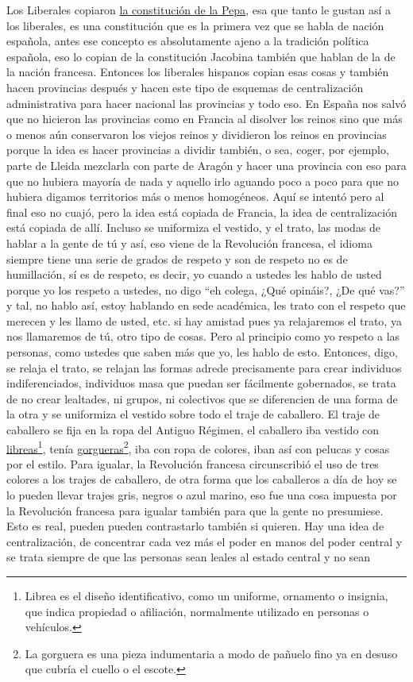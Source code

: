 Los Liberales copiaron \href{https://en.wikipedia.org/wiki/Spanish_Constitution_of_1812}{la constitución de la Pepa}, esa que tanto le gustan así a los liberales, es una constitución que es la primera vez que se habla de nación española, antes ese concepto es absolutamente ajeno a la tradición política española, eso lo copian de la constitución Jacobina también que hablan de la de la nación francesa. Entonces los liberales hispanos copian esas cosas y también hacen provincias después y hacen este tipo de esquemas de centralización administrativa para hacer nacional las provincias y todo eso. En España nos salvó que no hicieron las provincias como en Francia al disolver los reinos sino que más o menos aún conservaron los viejos reinos y dividieron los reinos en provincias porque la idea es hacer provincias a dividir también, o sea, coger, por ejemplo, parte de Lleida mezclarla con parte de Aragón y hacer una provincia con eso para que no hubiera mayoría de nada y aquello irlo aguando poco a poco para que no hubiera digamos territorios más o menos homogéneos. Aquí se intentó pero al final eso no cuajó, pero la idea está copiada de Francia, la idea de centralización está copiada de allí. Incluso se uniformiza el vestido, y el trato, las modas de hablar a la gente de tú y así, eso viene de la Revolución francesa, el idioma siempre tiene una serie de grados de respeto y son de respeto no es de humillación, sí es de respeto, es decir, yo cuando a ustedes les hablo de usted porque yo los respeto a ustedes, no digo \enquote{eh colega, ¿Qué opináis?, ¿De qué vas?} y tal, no hablo así, estoy hablando en sede académica, les trato con el respeto que merecen y les llamo de usted, etc. si hay amistad pues ya relajaremos el trato, ya nos llamaremos de tú, otro tipo de cosas. Pero al principio como yo respeto a las personas, como ustedes que saben más que yo, les hablo de esto. Entonces, digo, se relaja el trato, se relajan las formas adrede precisamente para crear individuos indiferenciados, individuos masa que puedan ser fácilmente gobernados, se trata de no crear lealtades, ni grupos, ni colectivos que se diferencien de una forma de la otra y se uniformiza el vestido sobre todo el traje de caballero. El traje de caballero se fija en la ropa del Antiguo Régimen, el caballero iba vestido con \href{https://en.wikipedia.org/wiki/Livery}{libreas}\footnote{Librea es el diseño identificativo, como un uniforme, ornamento o insignia, que indica propiedad o afiliación, normalmente utilizado en personas o vehículos.}, tenía \href{https://es.wikipedia.org/wiki/Gorguera}{gorgueras}\footnote{La gorguera es una pieza indumentaria a modo de pañuelo fino ya en desuso que cubría el cuello o el escote.}, iba con ropa de colores, iban así con pelucas y cosas por el estilo. Para igualar, la Revolución francesa circunscribió el uso de tres colores a los trajes de caballero, de otra forma que los caballeros a día de hoy se lo pueden llevar trajes gris, negros o azul marino, eso fue una cosa impuesta por la Revolución francesa para igualar también para que la gente no presumiese. Esto es real, pueden pueden contrastarlo también si quieren. Hay una idea de centralización, de concentrar cada vez más el poder en manos del poder central y se trata siempre de que las personas sean leales al estado central y no sean 